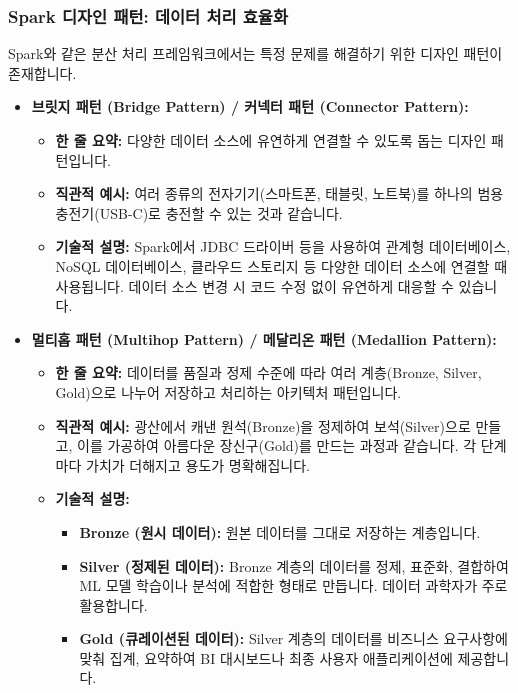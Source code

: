 \documentclass[11pt,a4paper]{article}
\begin{document}
\subsubsection*{Spark 디자인 패턴: 데이터 처리 효율화}
Spark와 같은 분산 처리 프레임워크에서는 특정 문제를 해결하기 위한 디자인 패턴이 존재합니다.
\begin{itemize}
    \item \textbf{브릿지 패턴 (Bridge Pattern) / 커넥터 패턴 (Connector Pattern):}
    \begin{itemize}
        \item \textbf{한 줄 요약:} 다양한 데이터 소스에 유연하게 연결할 수 있도록 돕는 디자인 패턴입니다.
        \item \textbf{직관적 예시:} 여러 종류의 전자기기(스마트폰, 태블릿, 노트북)를 하나의 범용 충전기(USB-C)로 충전할 수 있는 것과 같습니다.
        \item \textbf{기술적 설명:} Spark에서 JDBC 드라이버 등을 사용하여 관계형 데이터베이스, NoSQL 데이터베이스, 클라우드 스토리지 등 다양한 데이터 소스에 연결할 때 사용됩니다. 데이터 소스 변경 시 코드 수정 없이 유연하게 대응할 수 있습니다.
    \end{itemize}
    \item \textbf{멀티홉 패턴 (Multihop Pattern) / 메달리온 패턴 (Medallion Pattern):}
    \begin{itemize}
        \item \textbf{한 줄 요약:} 데이터를 품질과 정제 수준에 따라 여러 계층(Bronze, Silver, Gold)으로 나누어 저장하고 처리하는 아키텍처 패턴입니다.
        \item \textbf{직관적 예시:} 광산에서 캐낸 원석(Bronze)을 정제하여 보석(Silver)으로 만들고, 이를 가공하여 아름다운 장신구(Gold)를 만드는 과정과 같습니다. 각 단계마다 가치가 더해지고 용도가 명확해집니다.
        \item \textbf{기술적 설명:}
        \begin{itemize}
            \item \textbf{Bronze (원시 데이터):} 원본 데이터를 그대로 저장하는 계층입니다.
            \item \textbf{Silver (정제된 데이터):} Bronze 계층의 데이터를 정제, 표준화, 결합하여 ML 모델 학습이나 분석에 적합한 형태로 만듭니다. 데이터 과학자가 주로 활용합니다.
            \item \textbf{Gold (큐레이션된 데이터):} Silver 계층의 데이터를 비즈니스 요구사항에 맞춰 집계, 요약하여 BI 대시보드나 최종 사용자 애플리케이션에 제공합니다.
        \end{itemize}

\end{itemize}
\end{itemize}
\end{document}
